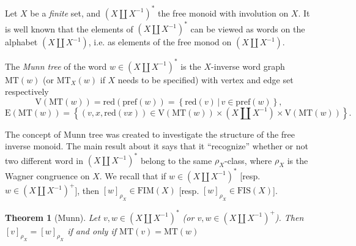 \documentclass[12pt]{article}
\newtheorem{thm}{Theorem}
\begin{document}



\newcommand{\virg}[1]{``#1''}

\newcommand{\redu}{\mathrm{red}}

\newcommand{\prefi}{\mathrm{pref}}


\newcommand{\V}{\mathrm{V}}
\newcommand{\E}{\mathrm{E}}
\newcommand{\schG}{\mathcal{S}\Gamma}

\newcommand{\e}{\mathrm{e}}
\newcommand{\co}{\mathrm{c}}

\newcommand{\cbra}[1]{\left( #1 \right)}
\newcommand{\qbra}[1]{\left[ #1 \right]}
\newcommand{\gbra}[1]{\left\{ #1 \right\}}
\newcommand{\abra}[1]{\left\langle #1 \right\rangle}

\newcommand{\mipres}[2]{\mathrm{Inv}^1\abra{#1 | #2}}
\newcommand{\sipres}[2]{\mathrm{Inv}\abra{#1 | #2}}
\newcommand{\mt}{\mathrm{MT}}
\newcommand{\fim}{\mathrm{FIM}}
\newcommand{\fis}{\mathrm{FIS}}

\newcommand{\double}[1]{\cbra{#1\amalg #1^{-1}}}
\newcommand{\doubles}[1]{\cbra{#1\amalg #1^{-1}}^\ast}
\newcommand{\doublep}[1]{\cbra{#1\amalg #1^{-1}}^+}

Let $X$ be a \emph{finite} set, and $\doubles X$ the free monoid with involution on $X$. It is well known that the elements of $\doubles X$ can be viewed as words on the alphabet $\double X$, i.e. as elements of the free monod on $\double X$.

The \emph{Munn tree} of the word $w\in\doubles X$ is the $X$-inverse word graph $\mt(w)$ (or $\mt_X(w)$ if $X$ needs to be specified) with vertex and edge set respectively 
$$\V(\mt(w))=\redu(\prefi(w))=\gbra{\redu(v)\,|\,v\in\prefi(w)},$$
$$\E(\mt(w))=\gbra{(v,x,\redu(vx))  \in  \V(\mt(w))\times \double X \times \V(\mt(w))}.$$


The concept of Munn tree was created to investigate the structure of the free inverse monoid. The main result about it says that it \virg{recognize} whether or not two different word in $\doubles X$ belong to the same $\rho_X$-class, where $\rho_X$ is the Wagner congruence on $X$. We recall that if $w\in\doubles X$ [resp. $w\in\doublep X$], then $[w]_{\rho_X}\in\fim(X)$ [resp. $[w]_{\rho_X}\in\fis(X)$].
\begin{thm}[Munn]
Let $v,w\in\doubles X$ (or $v,w\in\doublep X$). Then $[v]_{\rho_X}=[w]_{\rho_X}$ if and only if $\mt(v)=\mt(w)$
\end{thm}
\end{document}
